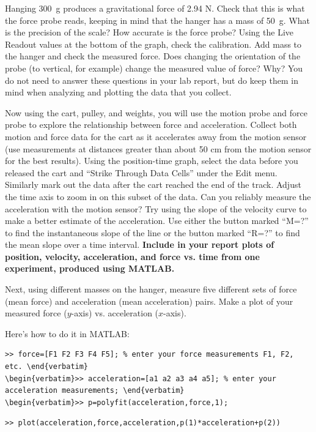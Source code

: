 \documentclass[11pt,letterpaper]{article}
\newcounter{question}[section]
\begin{document}
Hanging 300~g produces a gravitational force of 2.94 N.  Check that this is what the force probe reads, keeping in mind that the hanger has a mass of 50~g.  What is the precision of the scale? How accurate is the force probe?  Using the Live Readout values at the bottom of the graph, check the calibration. Add mass to the hanger and check the measured force.  Does changing the orientation of the probe (to vertical, for example) change the measured value of force? Why? You do not need to answer these questions in your lab report, but do keep them in mind when analyzing and plotting the data that you collect.

Now using the cart, pulley, and weights, you will use the motion probe and force probe to explore the relationship between force and acceleration. Collect both motion and force data for the cart as it accelerates away from the motion sensor (use measurements at distances greater than about 50 cm from the motion sensor for the best results).  Using the position-time graph, select the data before you released the cart and ``Strike Through Data Cells'' under the Edit menu.  Similarly mark out the data after the cart reached the end of the track.  Adjust the time axis to zoom in on this subset of the data.  Can you reliably measure the acceleration with the motion sensor?  Try using the slope of the velocity curve to make a better estimate of the
acceleration. Use either the button marked ``M=?'' to find the instantaneous slope of the line or the button marked ``R=?'' to find the mean slope over a time interval. \textbf{Include in your report plots of position, velocity, acceleration, and force vs. time from one experiment, produced using MATLAB.}%

Next, using different masses on the hanger, measure five different sets of force (mean force) and acceleration (mean acceleration) pairs. Make a plot of your measured force ($y$-axis) vs. acceleration ($x$-axis). 

Here's how to do it in MATLAB:
\begin{verbatim}>> force=[F1 F2 F3 F4 F5]; % enter your force measurements F1, F2, etc. \end{verbatim}
\begin{verbatim}>> acceleration=[a1 a2 a3 a4 a5]; % enter your acceleration measurements; \end{verbatim}
\begin{verbatim}>> p=polyfit(acceleration,force,1); \end{verbatim}
\begin{verbatim}>> plot(acceleration,force,acceleration,p(1)*acceleration+p(2)) \end{verbatim}
\end{document}

